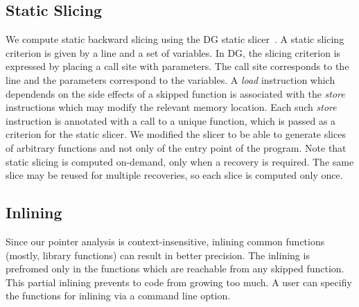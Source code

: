 \subsection{Static Slicing}
We compute static backward slicing using the DG static slicer~\cite{dg}.
A static slicing criterion is given by a line and a set of variables.
In DG, the slicing criterion is expressed by placing a call site with parameters.
The call site corresponds to the line and the parameters correspond to the variables.
A \textit{load} instruction which dependends on the side effects of a skipped function
is associated with the \textit{store} instructions which may modify the relevant memory location.
Each such \textit{store} instruction is annotated with a call to a unique function,
which is passed as a criterion for the static slicer.
We modified the slicer to be able to generate slices of arbitrary functions and not
only of the entry point of the program. Note that static slicing is
computed on-demand, only when a recovery is required. The same slice
may be reused for multiple recoveries, so each slice is computed only
once.

\subsection{Inlining}
Since our pointer analysis is context-insensitive,
inlining common functions (mostly, library functions) can result in better precision.
The inlining is prefromed only in the functions which are reachable from any skipped function.
This partial inlining prevents to code from growing too much.
A user can specifiy the functions for inlining via a command line option.

